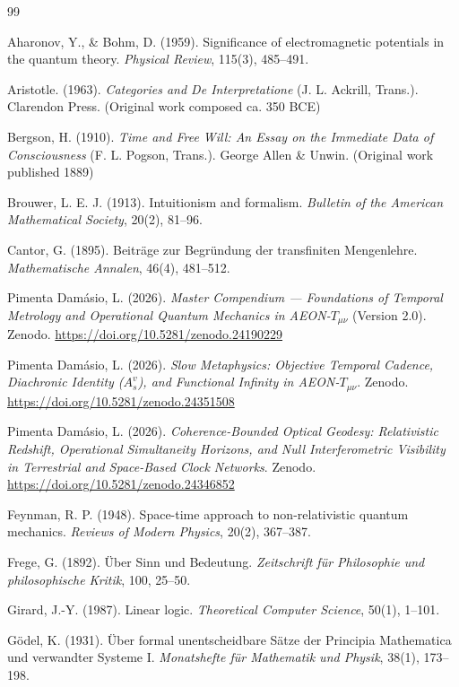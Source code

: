 \documentclass[11pt,a4paper]{article}
\begin{document}
\begin{thebibliography}{99}

Aharonov, Y., \& Bohm, D. (1959). Significance of electromagnetic potentials in the quantum theory. \emph{Physical Review}, 115(3), 485--491.

Aristotle. (1963). \emph{Categories and De Interpretatione} (J. L. Ackrill, Trans.). Clarendon Press. (Original work composed ca. 350 BCE)

Bergson, H. (1910). \emph{Time and Free Will: An Essay on the Immediate Data of Consciousness} (F. L. Pogson, Trans.). George Allen \& Unwin. (Original work published 1889)

Brouwer, L. E. J. (1913). Intuitionism and formalism. \emph{Bulletin of the American Mathematical Society}, 20(2), 81--96.

Cantor, G. (1895). Beiträge zur Begründung der transfiniten Mengenlehre. \emph{Mathematische Annalen}, 46(4), 481--512.

Pimenta Damásio, L. (2026). \emph{Master Compendium — Foundations of Temporal Metrology and Operational Quantum Mechanics in AEON-$T_{\mu\nu}$} (Version 2.0). Zenodo. \url{https://doi.org/10.5281/zenodo.24190229}

Pimenta Damásio, L. (2026). \emph{Slow Metaphysics: Objective Temporal Cadence, Diachronic Identity ($A_s^v$), and Functional Infinity in AEON-$T_{\mu\nu}$}. Zenodo. \url{https://doi.org/10.5281/zenodo.24351508}

Pimenta Damásio, L. (2026). \emph{Coherence-Bounded Optical Geodesy: Relativistic Redshift, Operational Simultaneity Horizons, and Null Interferometric Visibility in Terrestrial and Space-Based Clock Networks}. Zenodo. \url{https://doi.org/10.5281/zenodo.24346852}

Feynman, R. P. (1948). Space-time approach to non-relativistic quantum mechanics. \emph{Reviews of Modern Physics}, 20(2), 367--387.

Frege, G. (1892). Über Sinn und Bedeutung. \emph{Zeitschrift für Philosophie und philosophische Kritik}, 100, 25--50.

Girard, J.-Y. (1987). Linear logic. \emph{Theoretical Computer Science}, 50(1), 1--101.

Gödel, K. (1931). Über formal unentscheidbare Sätze der Principia Mathematica und verwandter Systeme I. \emph{Monatshefte für Mathematik und Physik}, 38(1), 173--198.


\end{thebibliography}
\end{document}
